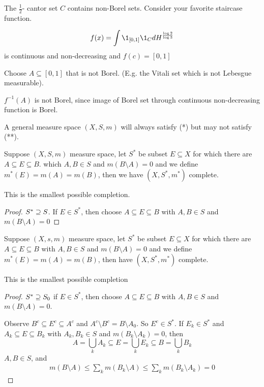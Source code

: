 \begin{example}
	The $\frac{1}{2}$- cantor set $C$ contains non-Borel sets.
	Consider your favorite staircase function.

	\[
		f(x) = \int \1_{[0,1]}\1_{C} dH^{\frac{\log{2}}{\log{3}}}
	\] 
	is continuous and non-decreasing and $f(c) = [0,1]$
\end{example}

Choose $A \subseteq [0,1]$ that is not Borel. (E.g. the Vitali set which is not Lebesgue measurable).

$f^{-1} (A)$ is not Borel, since image of Borel set through continuous non-decreasing function is Borel.


\begin{remark}
	A general measure space $(X, S, m)$ will always satisfy (*) but may not satisfy  (**).
\end{remark}

\begin{theorem}
	Suppose $(X,S, m)$ measure space, let $S^*$ be subset $E \subseteq X$ for which there are $A \subseteq E \subseteq B$.
	which $A,B \in S$ and $m(B \setminus A) = 0$ and we define  $m^*(E) = m(A) = m(B)$, then we have $(X,S^*, m^*)$ complete.
\end{theorem}

\begin{remark}
	This is the smallest possible completion.
\end{remark}

\begin{proof}
	$S^* \supseteq S$. If $E \in S^*$, then choose $A \subseteq E \subseteq B$ with $A,B \in S$ and $m(B \setminus A) = 0$
\end{proof}

\begin{theorem}
	Suppose $(X,s, m)$ measure space, let $S^*$ be subset $E \subseteq X$ for which there are $A \subseteq E \subseteq B$ with 
	$A, B \in S$ and $m(B \setminus A) = 0$ and we define  $m^*(E) = m(A) = m(B)$, then have $(X,S^*, m^*)$ complete.
\end{theorem}

\begin{remark}
	This is the smallest possible completion
\end{remark}

\begin{proof}
	$S^* \supseteq S_0$ if $E \in S^*$, then choose $A \subseteq E \subseteq B$ with $A,B \in S$ and  $m(B \setminus A) = 0$.

	Observe  $B^c \subseteq E^c \subseteq A^c$ and $A^c \setminus B^c = B \setminus A_0$. So
	 $E^c \in S^*$. If $E_k \in S^*$ and $A_k \subseteq E \subseteq B_k$ with $A_k, B_k \in S$ and $m(B_k \setminus A_k) = 0$, 
	 then
	 \[
		 A = \bigcup_{k} A_k \subseteq 
		 E = \bigcup_{k} E_k \subseteq 
		 B = \bigcup_{k} B_k
	 \] 
	 $A,B \in S$, and
	 \begin{align*}
		 m(B \setminus A) \leq \sum_{k} m(B_{k} \setminus A) \leq \sum_{k} m(B_{k} \setminus A_k) = 0
	 \end{align*}
\end{proof}

